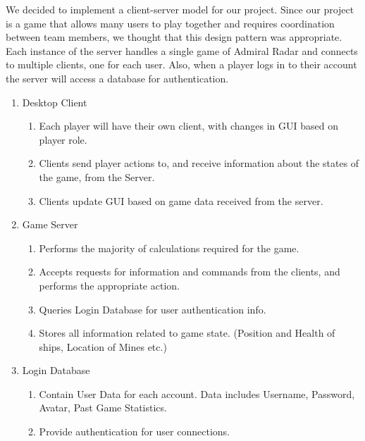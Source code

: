 We decided to implement a client-server model for our project. Since our project is a game that allows many users to play together and requires coordination between team members, we thought that this design pattern was appropriate. Each instance of the server handles a single game of Admiral Radar and connects to multiple clients, one for each user. Also,  when a player logs in to their account the server will access a database for authentication.

\begin{enumerate}
\item Desktop Client
\begin{enumerate}
\item Each player will have their own client, with changes in GUI based on player role.
\item Clients send player actions to, and receive information about the states of the game, from the Server.
\item Clients update GUI based on game data received from the server.
\end{enumerate}

\item Game Server
\begin{enumerate}
\item Performs the majority of calculations required for the game.
\item Accepts requests for information and commands from the clients, and performs the appropriate action.
\item Queries Login Database for user authentication info.
\item Stores all information related to game state. (Position and Health of ships, Location of Mines etc.)
\end{enumerate}

\item Login Database
\begin{enumerate}
\item Contain User Data for each account. Data includes Username, Password, Avatar, Past Game Statistics.
\item Provide authentication for user connections.
\end{enumerate}
\end{enumerate}
